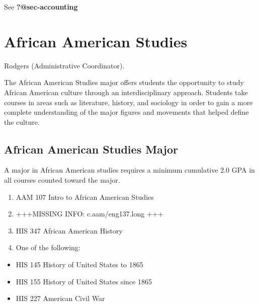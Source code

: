 \documentclass[
  letterpaper,
]{scrbook}
\providecommand{\tightlist}{%
  \setlength{\itemsep}{0pt}\setlength{\parskip}{0pt}}
\begin{document}
See \textbf{?@sec-accounting}

\hypertarget{african-american-studies}{%
\section{African American Studies}\label{african-american-studies}}

Rodgers (Administrative Coordinator).

The African American Studies major offers students the opportunity to
study African American culture through an interdisciplinary approach.
Students take courses in areas such as literature, history, and
sociology in order to gain a more complete understanding of the major
figures and movements that helped define the culture.

\hypertarget{african-american-studies-major}{%
\subsection{African American Studies
Major}\label{african-american-studies-major}}

A major in African American studies requires a minimum cumulative 2.0
GPA in all courses counted toward the major.

\begin{enumerate}
\def\labelenumi{\arabic{enumi}.}
\tightlist
\item
  AAM 107 Intro to African American Studies
\item
  +++MISSING INFO: c.aam/eng137.long +++
\item
  HIS 347 African American History
\item
  One of the following:
\end{enumerate}

\begin{itemize}
\tightlist
\item
  HIS 145 History of United States to 1865
\item
  HIS 155 History of United States since 1865
\item
  HIS 227 American Civil War
\end{itemize}
\end{document}
